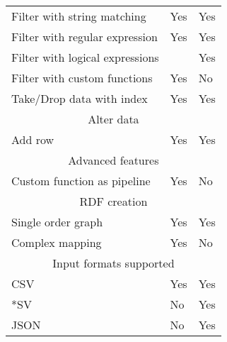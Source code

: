 \begin{table}[]
\begin{tabular}{lll}
Filter with string matching             & Yes     & Yes     \\
Filter with regular expression          & Yes     & Yes     \\
Filter with logical expressions         &         & Yes     \\
Filter with custom functions            & Yes     & No      \\
Take/Drop data with index               & Yes     & Yes     \\
\multicolumn{3}{c}{{\color[rgb]{0.210,0.175,0.47} Alter data}} \\
Add row                                 & Yes     & Yes     \\
\multicolumn{3}{c}{{\color[rgb]{0.210,0.175,0.47} Advanced features}} \\
Custom function as pipeline             & Yes     & No      \\
\multicolumn{3}{c}{{\color[rgb]{0.210,0.175,0.47} RDF creation}} \\
Single order graph                      & Yes     & Yes     \\
Complex mapping                         & Yes     & No      \\
\multicolumn{3}{c}{{\color[rgb]{0.210,0.175,0.47} Input formats supported}} \\
CSV                                     & Yes     & Yes     \\
*SV                                     & No      & Yes     \\
JSON                                    & No      & Yes    
\end{tabular}
\end{table}
